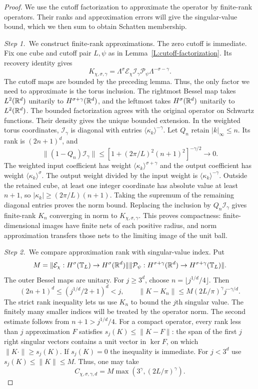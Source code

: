 \begin{proof}
  We use the cutoff factorization to approximate the operator by finite-rank
  operators. Their ranks and approximation errors will give the singular-value
  bound, which we then sum to obtain Schatten membership.

  \medskip
  \noindent\textit{Step 1.~}We construct finite-rank approximations.
  The zero cutoff is immediate. Fix one cube and cutoff pair $L,\psi$ as in
  Lemma~\ref{L:cutoff-factorization}. Its recovery identity gives
  \[
    K_{\chi,\sigma,\gamma}
    =\Lambda^\sigma\mathcal{E}_\chi\mathcal{I}_\gamma
    \mathcal{P}_\psi\Lambda^{-\sigma-\gamma}.
  \]
  The cutoff maps are bounded by the preceding lemma. Thus, the only
  factor we need to approximate is the torus inclusion.
  The rightmost Bessel map takes $L^2(\mathbb{R}^d)$ unitarily to
  $H^{\sigma+\gamma}(\mathbb{R}^d)$, and the leftmost takes $H^\sigma(\mathbb{R}^d)$ unitarily
  to $L^2(\mathbb{R}^d)$. The bounded factorization agrees with the original operator
  on Schwartz functions. Their density gives the unique bounded extension.
  In the weighted torus coordinates, $\mathcal{I}_\gamma$ is diagonal with
  entries $\langle\kappa_k\rangle^{-\gamma}$. Let $Q_n$ retain $|k|_\infty \le
  n$. Its rank is $(2n+1)^d$, and
  \[
    \|(1-Q_n)\mathcal{I}_\gamma\|
    \le [1+(2\pi/L)^2(n+1)^2]^{-\gamma/2}\longrightarrow0.
  \]
  The weighted input coefficient has weight
  $\langle\kappa_k\rangle^{\sigma+\gamma}$ and the output coefficient has
  weight $\langle\kappa_k\rangle^\sigma$. The output weight divided by
  the input weight is
  $\langle\kappa_k\rangle^{-\gamma}$. Outside the retained cube, at least one
  integer coordinate has absolute value at least $n+1$, so $|\kappa_k| \ge
  (2\pi/L)(n+1)$. Taking the supremum of the remaining diagonal entries proves
  the norm bound.
  Replacing the inclusion by $Q_n\mathcal{I}_\gamma$ gives finite-rank $K_n$
  converging in norm to $K_{\chi,\sigma,\gamma}$. This proves compactness:
  finite-dimensional images have finite nets of each positive radius, and norm
  approximation transfers those nets to the limiting image of the unit ball.


  \medskip
  \noindent\textit{Step 2.~}We compare approximation rank with
  singular-value index.
  Put
  \[
    M=\|\mathcal{E}_\chi:H^\sigma(\mathbb{T}_L)\to H^\sigma(\mathbb{R}^d)\|
    \|\mathcal{P}_\psi:H^{\sigma+\gamma}(\mathbb{R}^d)
    \to H^{\sigma+\gamma}(\mathbb{T}_L)\|.
  \]
  The outer Bessel maps are unitary. For $j \ge 3^d$, choose $n = \lfloor
  j^{1/d}/4\rfloor$. Then
  \[
    (2n+1)^d\le(j^{1/d}/2+1)^d<j,\qquad
    \|K-K_n\|\le M(2L/\pi)^\gamma j^{-\gamma/d}.
  \]
  The strict rank inequality lets us use $K_n$ to bound the $j$th singular
  value. The finitely many smaller indices will be treated by the operator
  norm.
  The second estimate follows from $n+1 > j^{1/d}/4$. For a compact operator,
  every rank less than $j$ approximation $F$ satisfies $s_j(K) \le \|K-F\|$: the
  span of the first $j$ right singular vectors contains a unit vector in $\ker
  F$, on which $\|K\cdot\| \ge s_j(K)$. If $s_j(K) = 0$ the inequality is
  immediate. For $j < 3^d$ use $s_j(K) \le \|K\| \le M$. Thus, one may take
  \[
    C_{\chi,\sigma,\gamma,d}
    =M\max(3^\gamma,(2L/\pi)^\gamma).
  \]


\end{proof}
